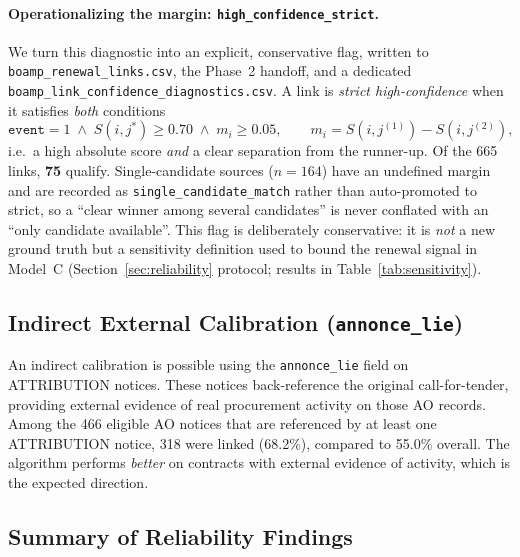 \documentclass[12pt, a4paper]{article}
\begin{document}
\paragraph{Operationalizing the margin: \texttt{high\_confidence\_strict}.}
We turn this diagnostic into an explicit, conservative flag, written to
\texttt{boamp\_renewal\_links.csv}, the Phase~2 handoff, and a dedicated
\texttt{boamp\_link\_confidence\_diagnostics.csv}. A link is \emph{strict
high-confidence} when it satisfies \emph{both} conditions
\[
  \texttt{event}=1 \;\wedge\; S(i,j^*) \geq 0.70 \;\wedge\;
  m_i \geq 0.05, \qquad m_i = S(i,j^{(1)}) - S(i,j^{(2)}),
\]
i.e.\ a high absolute score \emph{and} a clear separation from the runner-up.
Of the 665 links, \textbf{75} qualify. Single-candidate sources ($n = 164$)
have an undefined margin and are recorded as \texttt{single\_candidate\_match}
rather than auto-promoted to strict, so a ``clear winner among several
candidates'' is never conflated with an ``only candidate available''. This flag
is deliberately conservative: it is \emph{not} a new ground truth but a
sensitivity definition used to bound the renewal signal in Model~C
(Section~\ref{sec:reliability} protocol; results in
Table~\ref{tab:sensitivity}).

\subsection{Indirect External Calibration (\texttt{annonce\_lie})}

An indirect calibration is possible using the \texttt{annonce\_lie} field on
ATTRIBUTION notices. These notices back-reference the original call-for-tender,
providing external evidence of real procurement activity on those AO records.
Among the 466 eligible AO notices that are referenced by at least one
ATTRIBUTION notice, 318 were linked (68.2\%), compared to 55.0\% overall.
The algorithm performs \textit{better} on contracts with external evidence of
activity, which is the expected direction.

\subsection{Summary of Reliability Findings}
\end{document}
